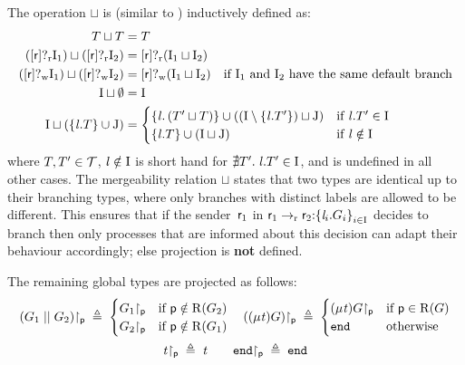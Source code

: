 The operation $ \sqcup $ is (similar to \cite{YoshidaDanielouBejleriHu10}) inductively defined as:
\begin{align*}
	\LT \sqcup \LT &= \LT\\
	\left( \LBranR{\Role}{\indexSet_1} \right) \sqcup \left( \LBranR{\Role}{\indexSet_2} \right) &= \LBranR{\Role}{\left( \indexSet_1 \sqcup \indexSet_2 \right)}\\
	\left( \LBranW{\Role}{\indexSet_1} \right) \sqcup \left( \LBranW{\Role}{\indexSet_2} \right) &= \LBranW{\Role}{\left( \indexSet_1 \sqcup \indexSet_2 \right)} \quad \text{if } \indexSet_1 \text{ and } \indexSet_2 \text{ have the same default branch}\\
	\indexSet \sqcup \emptyset &= \indexSet\\
	\indexSet \sqcup \left( \Set{ \Label.\LT } \cup \indexSet[J] \right) &=
		\begin{cases}
			\Set{ \Label.\left( \LT' \sqcup \LT \right) } \cup \left( \left( \indexSet \setminus \Set{ \Label.\LT' } \right) \sqcup \indexSet[J] \right) & \text{if } \Label.\LT' \in \indexSet\\
			\Set{ \Label.\LT } \cup \left( \indexSet \sqcup \indexSet[J] \right) & \text{if } \Label \notin \indexSet
		\end{cases}
\end{align*}
where $ \LT, \LT' \in \localTypes $, $ \Label \notin \indexSet $ is short hand for $ \nexists \LT'\logdot \Label.\LT' \in \indexSet $, and is undefined in all other cases.
The mergeability relation $ \sqcup $ states that two types are identical up to their branching types, where only branches with distinct labels are allowed to be different.
This ensures that if the sender~$ \Role_1 $ in $ \GBranR{\Role_1}{\Role_2}{\Set{ \Label_i.\GT_i }_{i \in \indexSet}} $ decides to branch then only processes that are informed about this decision can adapt their behaviour accordingly; else projection is \textbf{not} defined.

The remaining global types are projected as follows:
\[\begin{array}{c}
	\Proj{\left( \GPar{\GT_1}{\GT_2} \right)}{\Role[p]} \deff
		\begin{cases}
			\Proj{\GT_1}{\Role[p]} & \text{if } \Role[p] \notin \Roles{\GT_2}\\
			\Proj{\GT_2}{\Role[p]} & \text{if } \Role[p] \notin \Roles{\GT_1}
		\end{cases}
	\hspace{1em}
	\Proj{\left( \GRep{\TypeV}{\GT} \right)}{\Role[p]} \deff
		\begin{cases}
			\LRep{\TypeV}{\Proj{\GT}{\Role[p]}} & \text{if } \Role[p] \in \Roles{\GT}\\
			\LEnd & \text{otherwise}
		\end{cases} \vspace{0.5em}\\
	\Proj{\TypeV}{\Role[p]} \deff \TypeV
	\hspace{2em}
	\Proj{\GEnd}{\Role[p]} \deff \LEnd
\end{array}\]


